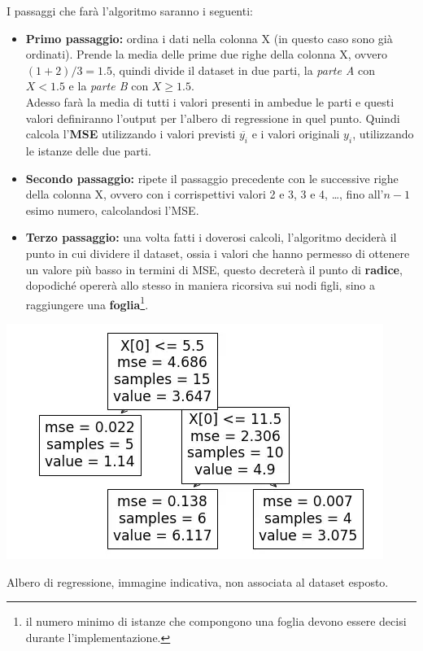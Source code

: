 \documentclass[a4paper, 11pt, oneside]{report}
\begin{document}
                \newpage
                \par \noindent I passaggi che farà l'algoritmo saranno i seguenti:
                \begin{itemize}
                    \item \textbf{Primo passaggio:} ordina i dati nella colonna X (in questo caso sono già ordinati).
                    Prende la media delle prime due righe della colonna X, ovvero $(1+2)/3 = 1.5$, quindi divide il dataset
                    in due parti, la \textit{parte A} con $X < 1.5$ e la \textit{parte B} con $X \geq 1.5$.
                    \\Adesso farà la media di tutti i valori presenti in ambedue le parti e questi valori
                    definiranno l'output per l'albero di regressione in quel punto. Quindi calcola l'\textbf{MSE}
                    utilizzando i valori previsti $\overline{y_i}$ e i valori originali $y_i$, utilizzando le istanze
                    delle due parti.
                    \item \textbf{Secondo passaggio:} ripete il passaggio precedente con le successive righe della colonna
                    X, ovvero con i corrispettivi valori 2 e 3, 3 e 4, \ldots, fino all'$n-1$esimo numero, calcolandosi
                    l'MSE.
                    \item \textbf{Terzo passaggio:} una volta fatti i doverosi calcoli, l'algoritmo deciderà il punto in cui
                    dividere il dataset, ossia i valori che hanno permesso di ottenere un valore più basso in termini di MSE, questo decreterà
                    il punto di \textbf{radice}, dopodiché opererà allo stesso in maniera ricorsiva sui nodi figli, sino a raggiungere
                    una \textbf{foglia}\footnote{il numero minimo di istanze che compongono una foglia devono essere decisi durante
                    l'implementazione.}.
                \end{itemize}
                \medskip
                \begin{center}
                    \hspace*{5em}\includegraphics[scale=0.7]{albero}
                    \par \noindet Albero di regressione, immagine indicativa, non associata al dataset esposto.
                \end{center}
\end{document}
